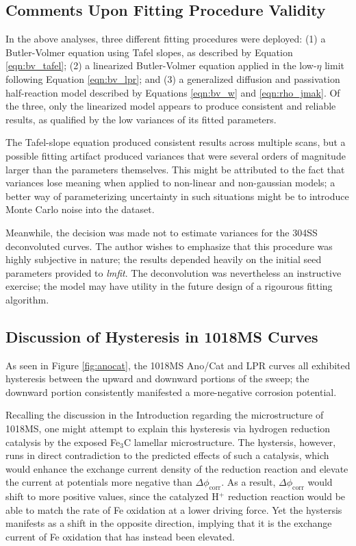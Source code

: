 \subsection{Comments Upon Fitting Procedure Validity}

In the above analyses, three different fitting procedures were deployed: (1) a Butler-Volmer equation using Tafel slopes, as described by Equation \ref{eqn:bv_tafel}; (2) a linearized Butler-Volmer equation applied in the low-$\eta$ limit following Equation \ref{eqn:bv_lpr}; and (3) a generalized diffusion and passivation half-reaction model described by Equations \ref{eqn:bv_w} and \ref{eqn:rho_jmak}.  Of the three, only the linearized model appears to produce consistent and reliable results, as qualified by the low variances of its fitted parameters.

The Tafel-slope equation produced consistent results across multiple scans, but a possible fitting artifact produced variances that were several orders of magnitude larger than the parameters themselves.  This might be attributed to the fact that variances lose meaning when applied to non-linear and non-gaussian models; a better way of parameterizing uncertainty in such situations might be to introduce Monte Carlo noise into the dataset.\cite{montecarlo}

Meanwhile, the decision was made not to estimate variances for the 304SS deconvoluted curves.  The author wishes to emphasize that this procedure was highly subjective in nature; the results depended heavily on the initial seed parameters provided to \textit{lmfit}.  The deconvolution was nevertheless an instructive exercise; the model may have utility in the future design of a rigourous fitting algorithm.

\subsection{Discussion of Hysteresis in 1018MS Curves}

As seen in Figure \ref{fig:anocat}, the 1018MS Ano/Cat and LPR curves all exhibited hysteresis between the upward and downward portions of the sweep; the downward portion consistently manifested a more-negative corrosion potential.

Recalling the discussion in the Introduction regarding the microstructure of 1018MS, one might attempt to explain this hysteresis via hydrogen reduction catalysis by the exposed Fe$_3$C lamellar microstructure.  The hystersis, however, runs in direct contradiction to the predicted effects of such a catalysis, which would enhance the exchange current density of the reduction reaction and elevate the current at potentials more negative than $\Delta \phi_{\text{corr}}$.  As a result, $\Delta \phi_{\text{corr}}$ would shift to more positive values, since the catalyzed H$^+$ reduction reaction would be able to match the rate of Fe oxidation at a lower driving force.  Yet the hystersis manifests as a shift in the opposite direction, implying that it is the exchange current of Fe oxidation that has instead been elevated.

